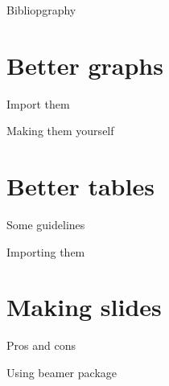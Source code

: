 \documentclass[ignorenonframetext,]{beamer}
\begin{document}
\begin{frame}{Bibliopgraphy}

\end{frame}

\section{Better graphs}\label{better-graphs}

\begin{frame}{Import them}

\end{frame}

\begin{frame}{Making them yourself}

\end{frame}

\section{Better tables}\label{better-tables}

\begin{frame}{Some guidelines}

\end{frame}

\begin{frame}{Importing them}

\end{frame}

\section{Making slides}\label{making-slides}

\begin{frame}{Pros and cons}

\end{frame}

\begin{frame}{Using beamer package}

\end{frame}
\end{document}
